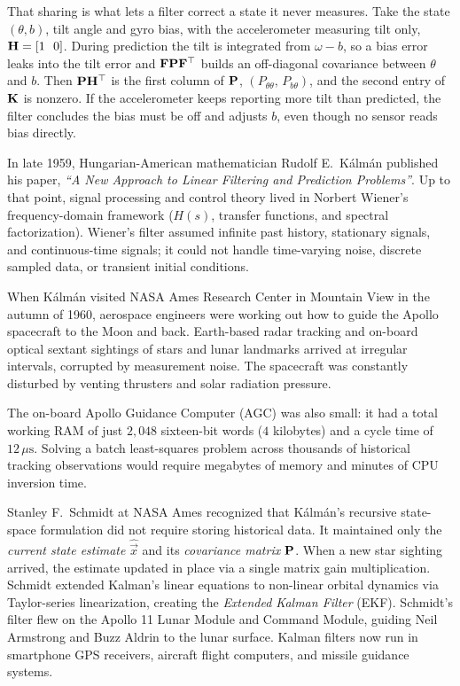 That sharing is what lets a filter correct a state it never measures. Take the state
$(\theta, b)$, tilt angle and gyro bias, with the accelerometer measuring tilt only,
$\mathbf{H} = [1\ \ 0]$. During prediction the tilt is integrated from $\omega - b$, so a
bias error leaks into the tilt error and $\mathbf{F}\mathbf{P}\mathbf{F}^\top$ builds an off-diagonal
covariance between $\theta$ and $b$. Then $\mathbf{P}\mathbf{H}^\top$ is the first column of
$\mathbf{P}$, $(P_{\theta\theta},\, P_{b\theta})$, and the second entry of $\mathbf{K}$ is
nonzero. If the accelerometer keeps reporting more tilt than predicted, the filter
concludes the bias must be off and adjusts $b$, even though no sensor reads bias
directly.

\begin{historybox}
In late 1959, Hungarian-American mathematician Rudolf E.~K\'alm\'an published his paper, \emph{``A New Approach to Linear Filtering and Prediction Problems''}. Up to that point, signal processing and control theory lived in Norbert Wiener's frequency-domain framework ($H(s)$, transfer functions, and spectral factorization). Wiener's filter assumed infinite past history, stationary signals, and continuous-time signals; it could not handle time-varying noise, discrete sampled data, or transient initial conditions.

When K\'alm\'an visited NASA Ames Research Center in Mountain View in the autumn of 1960, aerospace engineers were working out how to guide the Apollo spacecraft to the Moon and back. Earth-based radar tracking and on-board optical sextant sightings of stars and lunar landmarks arrived at irregular intervals, corrupted by measurement noise. The spacecraft was constantly disturbed by venting thrusters and solar radiation pressure. 

The on-board Apollo Guidance Computer (AGC) was also small: it had a total working RAM of just $2{,}048$ sixteen-bit words ($4$ kilobytes) and a cycle time of $12\,\mu\text{s}$. Solving a batch least-squares problem across thousands of historical tracking observations would require megabytes of memory and minutes of CPU inversion time.

Stanley F.~Schmidt at NASA Ames recognized that K\'alm\'an's recursive state-space formulation did not require storing historical data. It maintained only the \emph{current state estimate} $\hat{\vec{x}}$ and its \emph{covariance matrix} $\mathbf{P}$. When a new star sighting arrived, the estimate updated in place via a single matrix gain multiplication. Schmidt extended Kalman's linear equations to non-linear orbital dynamics via Taylor-series linearization, creating the \emph{Extended Kalman Filter} (EKF). Schmidt's filter flew on the Apollo 11 Lunar Module and Command Module, guiding Neil Armstrong and Buzz Aldrin to the lunar surface. Kalman filters now run in smartphone GPS receivers, aircraft flight computers, and missile guidance systems.


\end{historybox}

